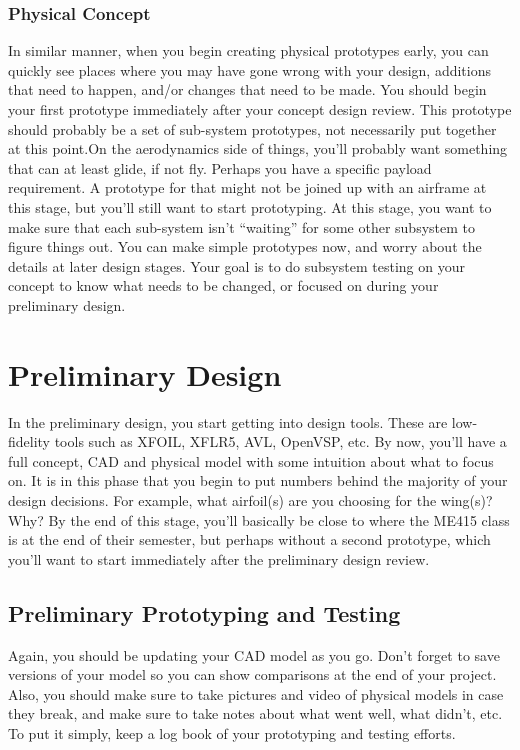 \documentclass[report]{byu-aero}
\begin{document}
\subsubsection{Physical Concept}
In similar manner, when you begin creating physical prototypes early, you can quickly see places where you may have gone wrong with your design, additions that need to happen, and/or changes that need to be made. You should begin your first prototype immediately after your concept design review.  This prototype should probably be a set of sub-system prototypes, not necessarily put together at this point.On the aerodynamics side of things, you'll probably want something that can at least glide, if not fly. Perhaps you have a specific payload requirement. A prototype for that might not be joined up with an airframe at this stage, but you'll still want to start prototyping. At this stage, you want to make sure that each sub-system isn't ``waiting'' for some other subsystem to figure things out. You can make simple prototypes now, and worry about the details at later design stages. Your goal is to do subsystem testing on your concept to know what needs to be changed, or focused on during your preliminary design. 

\section{Preliminary Design}

In the preliminary design, you start getting into design tools. These are low-fidelity tools such as XFOIL, XFLR5, AVL, OpenVSP, etc.  By now, you'll have a full concept, CAD and physical model with some intuition about what to focus on. It is in this phase that you begin to put numbers behind the majority of your design decisions. For example, what airfoil(s) are you choosing for the wing(s)? Why? By the end of this stage, you'll basically be close to where the ME415 class is at the end of their semester, but perhaps without a second prototype, which you'll want to start immediately after the preliminary design review.

\subsection{Preliminary Prototyping and Testing}
Again, you should be updating your CAD model as you go.  Don't forget to save versions of your model so you can show comparisons at the end of your project.  Also, you should make sure to take pictures and video of physical models in case they break, and make sure to take notes about what went well, what didn't, etc. To put it simply, keep a log book of your prototyping and testing efforts.
\end{document}
